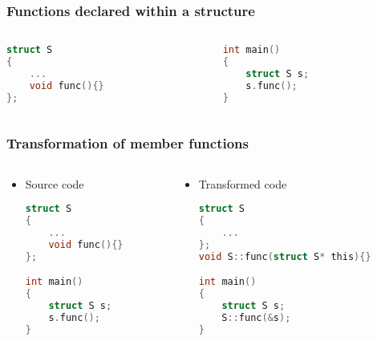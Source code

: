 \documentclass{beamer}
\begin{document}
\begin{frame}[fragile]
    \frametitle{Functions declared within a structure}

    \begin{example}
        \small
        \begin{columns}
            \begin{column}[]{0.4\textwidth}
                \begin{lstlisting}[language=C]
struct S
{
    ...
    void func(){}
};
                \end{lstlisting}

            \end{column}

            \begin{column}[]{0.4\textwidth}
                \begin{lstlisting}[language=C]
int main()
{
    struct S s;
    s.func();
}
                \end{lstlisting}
            \end{column}
        \end{columns}
    \end{example}
\end{frame}

\begin{frame}[fragile]
    \frametitle{Transformation of member functions}

    \begin{columns}
        \begin{column}[]{0.4\textwidth}
            \begin{itemize}
                \item Source code
                      \begin{lstlisting}[language=C]
struct S
{
    ...
    void func(){}
};

int main() 
{
    struct S s;
    s.func();
}
                    \end{lstlisting}
            \end{itemize}
        \end{column}

        \begin{column}[]{0.7\textwidth}
            \begin{itemize}
                \item Transformed code
                      \begin{lstlisting}[language=C]
struct S
{
    ...
};
void S::func(struct S* this){}

int main()
{
    struct S s;
    S::func(&s);
}
                \end{lstlisting}
            \end{itemize}
        \end{column}
    \end{columns}

\end{frame}
\end{document}
